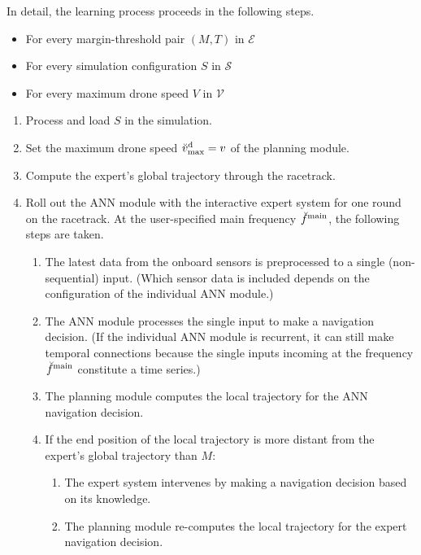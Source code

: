 In detail, the learning process proceeds in the following steps.
\begin{itemize}
    \item For every margin-threshold pair $(M,T)$ in $\mathcal{E}$
    \item For every simulation configuration $S$ in $\mathcal{S}$
    \item For every maximum drone speed $V$ in $\mathcal{V}$
\end{itemize}
\begin{enumerate}
    \item Process and load $S$ in the simulation.
    \item Set the maximum drone speed $\speed[\user]{\drone}{\mxm}{}{} = v$
    of the planning module.
    \item Compute the expert's global trajectory through the racetrack.
    \item Roll out the ANN module with the interactive expert system
    for one round on the racetrack.
    At the user-specified main frequency $\freq[\user]{\main}{}{}{}$, 
    the following steps are taken.
    \begin{enumerate}
        \item The latest data from the onboard sensors is preprocessed
        to a single (non-sequential) input.
        (Which sensor data is included depends on the configuration of the individual ANN module.)
        \item The ANN module processes the single input
        to make a navigation decision. 
        (If the individual ANN module is recurrent, it can still make temporal connections
        because the single inputs incoming at the frequency $\freq[\user]{\main}{}{}{}$
        constitute a time series.)
        \item The planning module computes the local trajectory for the ANN navigation decision.
        \item If the end position of the local trajectory 
        is more distant from the expert's global trajectory than $M$:
        \begin{enumerate}
            \item The expert system intervenes by making a navigation decision
            based on its knowledge.
            \item The planning module re-computes the local trajectory for the expert navigation decision.

\end{enumerate}
\end{enumerate}
\end{enumerate}
